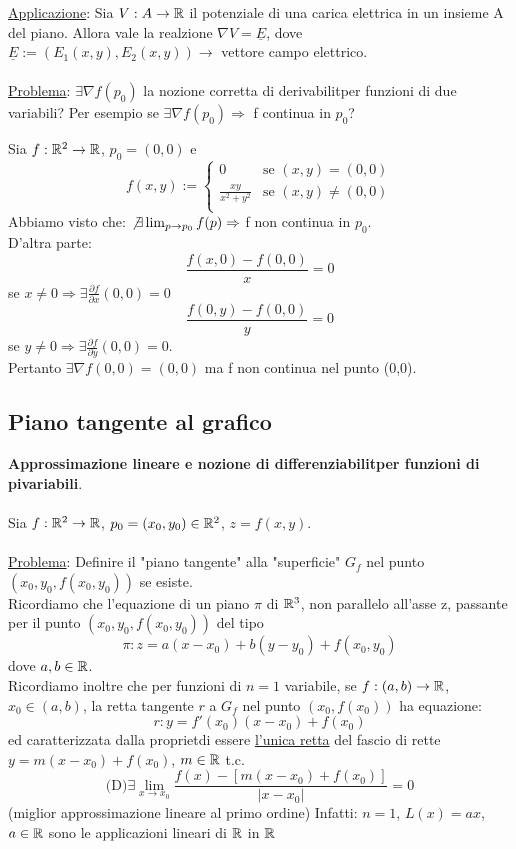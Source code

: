 \underline{Applicazione}: Sia $V:A\to \mathbb{R}$ il potenziale di una carica elettrica in un insieme A del piano. Allora 
vale la realzione $\nabla V = \underline{E}$, dove $\underline{E} := (E_1(x,y),E_2(x,y)) \rightarrow $ vettore campo elettrico.\\\\
\underline{Problema}: $\exists\nabla f(p_0)$ \ace la nozione corretta di derivabilit\aca per funzioni di due variabili? 
Per esempio se $\exists\nabla f(p_0) \Rightarrow $ f \ace continua in $p_0$?
\begin{example}
  Sia $f: \mathbb{R}^2 \to\mathbb{R}$, $p_0 = (0,0)$ e
  $$f(x,y):= \left\{\begin{array}{cl}
    0 & \text{se } (x,y) = (0,0) \\
    \frac{xy}{x^2+y^2} & \text{se } (x,y) \not = (0,0) \\
  \end{array}\right.$$
  Abbiamo visto che: $\not \exists \lim_{p \to p_0} f(p) \Rightarrow $ f non \ace continua in $p_0$.\\
  D'altra parte:
  $$\frac{f(x,0)-f(0,0)}{x} = 0$$
  se $x\not = 0 \Rightarrow \exists \frac{\partial f}{\partial x}(0,0) = 0$
  $$\frac{f(0,y)-f(0,0)}{y} = 0$$
  se $y\not = 0 \Rightarrow \exists \frac{\partial f}{\partial y}(0,0) = 0$. \\
  Pertanto $\exists \nabla f(0,0) = (0,0)$  ma f non \ace continua nel punto (0,0).
\end{example}
\subsection{Piano tangente al grafico}
\textbf{Approssimazione lineare e nozione di differenziabilit\aca per funzioni di pi\acu variabili}. \\\\
Sia $f:\mathbb{R}^2 \to \mathbb{R}$, $p_0 = (x_0,y_0) \in \mathbb{R}^2$, $z=f(x,y)$. \\\\
\underline{Problema}: Definire il "piano tangente" alla "superficie" $G_f$ nel punto $(x_0,y_0,f(x_0,y_0))$ se esiste.\\
Ricordiamo che l'equazione di un piano $\pi$ di $\mathbb{R}^3$, non parallelo all'asse z, passante per il punto 
$(x_0,y_0,f(x_0,y_0))$ \ace del tipo 
$$\pi : z = a(x-x_0) + b(y-y_0) + f(x_0,y_0)$$
dove $a,b \in \mathbb{R}$.\\
Ricordiamo inoltre che per funzioni di $n=1$ variabile, se $f:(a,b) \to \mathbb{R}$, $x_0\in (a,b)$, la retta tangente $r$ a 
$G_f$ nel punto $(x_0,f(x_0))$ ha equazione:
$$r: y = f'(x_0)(x-x_0) + f(x_0)$$
ed \ace caratterizzata dalla propriet\aca di essere \underline{l'unica retta} del fascio di rette $y=m(x-x_0)+f(x_0)$, 
$m\in\mathbb{R}$ t.c. 
$$\text{(D)} \exists \lim_{x\to x_0}\frac{f(x)-\left[m(x-x_0)+f(x_0)\right]}{\lvert x-x_0\rvert} = 0$$
(miglior approssimazione lineare al primo ordine)
Infatti: $n=1$, $L(x) = ax$, $a\in\mathbb{R}$ sono le applicazioni lineari di $\mathbb{R}$ in $\mathbb{R}$
\begin{exercise}
  
\end{exercise}